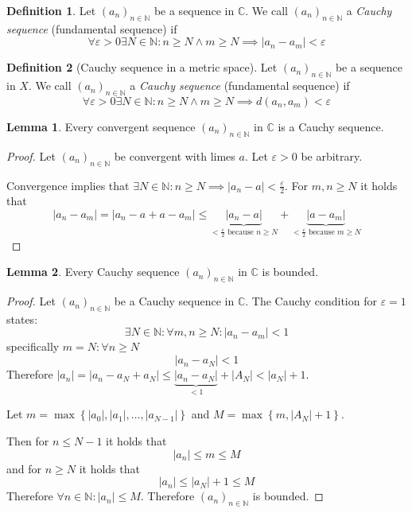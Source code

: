 \documentclass[a4paper,landscape,twocolumn]{article}
\theoremstyle{definition}
\newtheorem{defi}{Definition}
\newtheorem{lemma}{Lemma}
\newcommand\set[1]{\left\{#1\right\}}
\newcommand\abs[1]{\left|#1\right|}
\newcommand\seq[1]{{\left(#1\right)}_{n \in \mathbb N}}
\begin{document}
\begin{defi}
  Let $\seq{a_n}$ be a sequence in $\mathbb C$.
  We call $\seq{a_n}$ a \emph{Cauchy sequence} (fundamental sequence) if
  \[ \forall \varepsilon > 0 \exists N \in \mathbb N: n \geq N \land m \geq N \implies \abs{a_n - a_m} < \varepsilon \]
\end{defi}
\begin{defi}[Cauchy sequence in a metric space]
  Let $\seq{a_n}$ be a sequence in $X$.
  We call $\seq{a_n}$ a \emph{Cauchy sequence} (fundamental sequence) if
  \[ \forall \varepsilon > 0 \exists N \in \mathbb N: n \geq N \land m \geq N \implies d(a_n, a_m) < \varepsilon \]
\end{defi}

\begin{lemma}
  Every convergent sequence $\seq{a_n}$ in $\mathbb C$ is a Cauchy sequence.
\end{lemma}
\begin{proof}
  Let $\seq{a_n}$ be convergent with limes $a$.
  Let $\varepsilon > 0$ be arbitrary.

  Convergence implies that $\exists N \in \mathbb N: n \geq N \implies \abs{a_n - a} < \frac\varepsilon2$.
  For $m,n \geq N$ it holds that
  \[
      \abs{a_n - a_m}
      = \abs{a_n - a + a - a_m}
      \leq \underbrace{\abs{a_n - a}}_{< \frac\varepsilon2 \text{ because } n \geq N} + \underbrace{\abs{a - a_m}}_{< \frac\varepsilon2 \text{ because } m \geq N}
  \]
\end{proof}

\begin{lemma}
  Every Cauchy sequence $\seq{a_n}$ in $\mathbb C$ is bounded.
\end{lemma}
\begin{proof}
  Let $\seq{a_n}$ be a Cauchy sequence in $\mathbb C$.
  The Cauchy condition for $\varepsilon = 1$ states:
  \[ \exists N \in \mathbb N: \forall m,n \geq N: \abs{a_n - a_m} < 1 \]
  specifically $m = N: \forall n \geq N$
  \[ \abs{a_n - a_N} < 1 \]
  Therefore $\abs{a_n} = \abs{a_n - a_N + a_N} \leq \underbrace{\abs{a_n - a_N}}_{<1} + \abs{A_N} < \abs{a_N} + 1$.

  Let $m = \max\set{\abs{a_0}, \abs{a_1}, \dots, \abs{a_{N-1}}}$
  and $M = \max\set{m, \abs{A_N} + 1}$.

  Then for $n \leq N - 1$ it holds that
  \[ \abs{a_n} \leq m \leq M \]
  and for $n \geq N$ it holds that
  \[ \abs{a_n} \leq \abs{a_N} + 1 \leq M \]
  Therefore $\forall n \in \mathbb N: \abs{a_n} \leq M$.
  Therefore $\seq{a_n}$ is bounded.
\end{proof}
\end{document}
